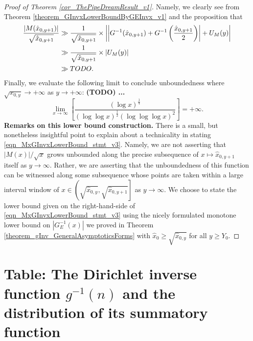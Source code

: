 \documentclass[11pt,reqno,a4letter]{article}
\numberwithin{figure}{section}
\numberwithin{table}{section}
\theoremstyle{plain}
\numberwithin{theorem}{section}
\theoremstyle{definition}
\begin{document}
\begin{proof}[Proof of Theorem \ref{cor_ThePipeDreamResult_v1}]
Namely, we clearly see from Theorem \ref{theorem_GInvxLowerBoundByGEInvx_v1} and the 
proposition that 
\begin{align} 
\notag 
\frac{|M(\hat{x}_{0,y+1})|}{\sqrt{\hat{x}_{0,y+1}}} & \gg \frac{1}{\sqrt{\hat{x}_{0,y+1}}} \times 
     \left\lvert \left\lvert 
     G^{-1}(\hat{x}_{0,y+1}) + G^{-1}\left(\frac{\hat{x}_{0,y+1}}{2}\right) \right\rvert + 
     U_M(y) \right\rvert \\ 
\notag 
     & \gg \frac{1}{\sqrt{\hat{x}_{0,y+1}}} \times \left\lvert U_M(y) \right\rvert \\ 
\label{eqn_MxGInvxLowerBound_stmt_v3} 
     & \gg TODO. 
\end{align} 
Finally, we evaluate the following limit to conclude unboundedness 
where $\sqrt{x_{0,y}} \rightarrow +\infty$ as $y \rightarrow +\infty$: 
\textbf{(TODO) ... } 
\[
\lim_{x \rightarrow \infty} \left[\frac{(\log x)^{\frac{1}{4}}}{ 
     (\log\log x)^{\frac{1}{2}} (\log\log\log x)^2}  
     \right] = +\infty. 
\] 
\textbf{Remarks on this lower bound construction.} 
There is a small, but nonetheless insightful point to explain about a 
technicality in stating \eqref{eqn_MxGInvxLowerBound_stmt_v3}. 
Namely, we are not asserting that 
$|M(x)| / \sqrt{x}$ grows unbounded along the precise subsequence of 
$x \mapsto \hat{x}_{0,y+1}$ itself as $y \rightarrow \infty$. 
Rather, we are asserting that the unboundedness of this function 
can be witnessed along some subsequence whose points are taken within a 
large interval window of 
$x \in \left(\sqrt{\hat{x}_{0,y}}, \sqrt{\hat{x}_{0,y+1}}\right]$ as 
$y \rightarrow \infty$. 
We choose to state the lower bound given on the right-hand-side of 
\eqref{eqn_MxGInvxLowerBound_stmt_v3} using the nicely formulated 
monotone lower bound on $|G_E^{-1}(x)|$ we proved in 
Theorem \ref{theorem_gInv_GeneralAsymptoticsForms} 
with $\hat{x}_0 \geq \sqrt{\hat{x}_{0,y}}$ for all $y \geq Y_0$. 
\end{proof} 

\newpage 
\renewcommand{\refname}{References} 
{}


\newpage
\setcounter{section}{0} 
\renewcommand{\thesection}{T.\arabic{section}} 

\section{Table: The Dirichlet inverse function $g^{-1}(n)$ and the 
         distribution of its summatory function} 
\label{table_conjecture_Mertens_ginvSeq_approx_values}
\end{document}
